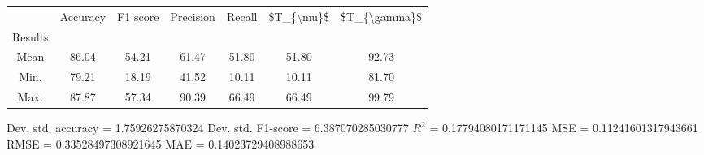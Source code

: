 \begin{tabular}{|c|c|c|c|c|c|c|}
\toprule
{} &  Accuracy &  F1 score &  Precision &  Recall &  \$T\_\{\textbackslash mu\}\$ &  \$T\_\{\textbackslash gamma\}\$ \\
Results &           &           &            &         &            &               \\
\hline
Mean    &     86.04 &     54.21 &      61.47 &   51.80 &      51.80 &         92.73 \\
Min.    &     79.21 &     18.19 &      41.52 &   10.11 &      10.11 &         81.70 \\
Max.    &     87.87 &     57.34 &      90.39 &   66.49 &      66.49 &         99.79 \\
\bottomrule
\end{tabular}

 Dev. std. accuracy = 1.75926275870324
 Dev. std. F1-score = 6.387070285030777
 $R^2$ = 0.17794080171171145
 MSE = 0.11241601317943661
 RMSE = 0.33528497308921645
 MAE = 0.14023729408988653